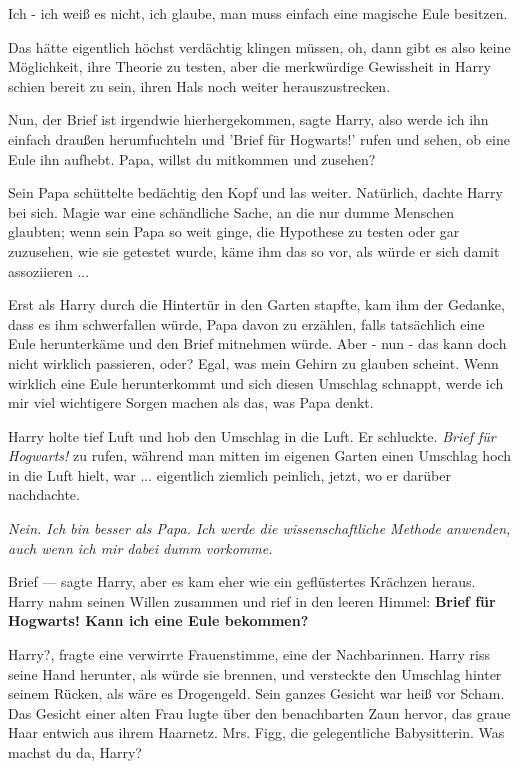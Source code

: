\glqq{}Ich - ich weiß es nicht, ich glaube, man muss einfach eine magische Eule
besitzen.\grqq{}

Das hätte eigentlich höchst verdächtig klingen müssen, oh, dann gibt es also
keine Möglichkeit, ihre Theorie zu testen, aber die merkwürdige Gewissheit in
Harry schien bereit zu sein, ihren Hals noch weiter herauszustrecken.

\glqq{}Nun, der Brief ist irgendwie hierhergekommen\grqq{}, sagte Harry, \glqq{}
also werde ich ihn einfach draußen herumfuchteln und 'Brief für Hogwarts!' rufen
und sehen, ob eine Eule ihn aufhebt. Papa, willst du mitkommen und
zusehen?\grqq{}

Sein Papa schüttelte bedächtig den Kopf und las weiter. Natürlich, dachte Harry
bei sich. Magie war eine schändliche Sache, an die nur dumme Menschen glaubten;
wenn sein Papa so weit ginge, die Hypothese zu testen oder gar zuzusehen, wie
sie getestet wurde, käme ihm das so vor, als würde er sich damit assoziieren ...

Erst als Harry durch die Hintertür in den Garten stapfte, kam ihm der Gedanke,
dass es ihm schwerfallen würde, Papa davon zu erzählen, falls tatsächlich eine
Eule herunterkäme und den Brief mitnehmen würde. Aber - nun - das kann doch
nicht wirklich passieren, oder? Egal, was mein Gehirn zu glauben scheint. Wenn
wirklich eine Eule herunterkommt und sich diesen Umschlag schnappt, werde ich
mir viel wichtigere Sorgen machen als das, was Papa denkt.

Harry holte tief Luft und hob den Umschlag in die Luft. Er schluckte. \emph{
\glqq{}Brief für Hogwarts!\grqq{}} zu rufen, während man mitten im eigenen Garten
einen Umschlag hoch in die Luft hielt, war ... eigentlich ziemlich peinlich,
jetzt, wo er darüber nachdachte.

\emph{Nein. Ich bin besser als Papa. Ich werde die wissenschaftliche Methode
anwenden, auch wenn ich mir dabei dumm vorkomme.}

\glqq{}Brief ---\grqq{} sagte Harry, aber es kam eher wie ein geflüstertes
Krächzen heraus. Harry nahm seinen Willen zusammen und rief in den leeren
Himmel: \textbf{\glqq{}Brief für Hogwarts! Kann ich eine Eule bekommen? \grqq{}}

\glqq{}Harry?\grqq{}, fragte eine verwirrte Frauenstimme, eine der Nachbarinnen.
Harry riss seine Hand herunter, als würde sie brennen, und versteckte den
Umschlag hinter seinem Rücken, als wäre es Drogengeld. Sein ganzes Gesicht war
heiß vor Scham. Das Gesicht einer alten Frau lugte über den benachbarten Zaun
hervor, das graue Haar entwich aus ihrem Haarnetz. Mrs. Figg, die gelegentliche
Babysitterin. \glqq{}Was machst du da, Harry?\grqq{}

